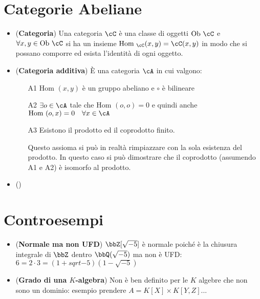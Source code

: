 \documentclass[a4paper,NoNotes,GeneralMath]{stdmdoc}
\newcommand{\Hom}{\text{Hom }}
\newcommand{\Ob}{\text{Ob }}
\begin{document}
\section*{Categorie Abeliane}
\begin{itemize}
\item ({\bf Categoria}) Una categoria $\cC$ è una classe di oggetti
  $\Ob \cC$ e $\forall x, y \in \Ob \cC$ si ha un insieme
  $\Hom_\cC (x, y) = \cC(x, y)$ in modo che si possano comporre ed
  esista l'identità di ogni oggetto.
\item ({\bf Categoria additiva}) È una categoria $\cA$ in cui valgono:
  \begin{enumerate}
  \item[A1] $\Hom(x, y)$ è un gruppo abeliano e $\circ$ è bilineare
  \item[A2] $\exists o \in \cA$ tale che $\Hom (o, o) = 0$ e quindi
    anche $\Hom (o, x) = 0 \quad \forall x \in \cA$
  \item[A3] Esistono il prodotto ed il coprodotto finito.

    Questo assioma si può in realtà rimpiazzare con la sola esistenza
    del prodotto. In questo caso si può dimostrare che il coprodotto
    (assumendo A1 e A2) è isomorfo al prodotto.
  \end{enumerate}
\item ({\bf })
\end{itemize}

\section*{Controesempi}
\begin{itemize}
\item ({\bf Normale ma non UFD}) $\bbZ[\sqrt{-5}]$ è normale poiché è la chiusura integrale di $\bbZ$ dentro $\bbQ(\sqrt{-5})$ ma non è UFD: $6 = 2 \cdot 3 = (1 + sqrt{-5}) (1 - \sqrt{-5})$
\item ({\bf Grado di una $K$-algebra}) Non è ben definito per le $K$ algebre che non sono un dominio: esempio prendere $A = K[X] \times K[Y, Z]$...
\end{itemize}
\end{document}
